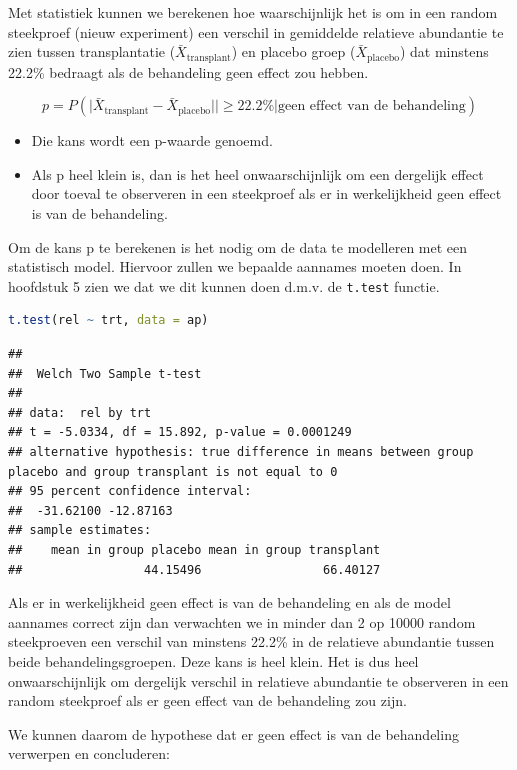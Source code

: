 \documentclass[
  12pt,dutch,coursenotes]{book}
\newcommand{\passthrough}[1]{#1}
\begin{document}
Met statistiek kunnen we berekenen hoe waarschijnlijk het is om in een random steekproef (nieuw experiment) een verschil in gemiddelde relatieve abundantie te zien tussen transplantatie (\(\bar X_\text{transplant}\)) en placebo groep (\(\bar X_\text{placebo}\)) dat minstens 22.2\% bedraagt als de behandeling geen effect zou hebben.

\[p=P( \vert \bar X_\text{transplant}-\bar X_\text{placebo}\vert \vert \geq 22.2\% \vert \text{geen effect van de behandeling})\]

\begin{itemize}
\item
  Die kans wordt een p-waarde genoemd.
\item
  Als p heel klein is, dan is het heel onwaarschijnlijk om een dergelijk effect door toeval te observeren in een steekproef als er in werkelijkheid geen effect is van de behandeling.
\end{itemize}

Om de kans p te berekenen is het nodig om de data te modelleren met een statistisch model. Hiervoor zullen we bepaalde aannames moeten doen. In hoofdstuk 5 zien we dat we dit kunnen doen d.m.v. de \passthrough{\lstinline!t.test!} functie.

\begin{lstlisting}[language=R]
t.test(rel ~ trt, data = ap)
\end{lstlisting}

\begin{lstlisting}
## 
##  Welch Two Sample t-test
## 
## data:  rel by trt
## t = -5.0334, df = 15.892, p-value = 0.0001249
## alternative hypothesis: true difference in means between group placebo and group transplant is not equal to 0
## 95 percent confidence interval:
##  -31.62100 -12.87163
## sample estimates:
##    mean in group placebo mean in group transplant 
##                 44.15496                 66.40127
\end{lstlisting}

Als er in werkelijkheid geen effect is van de behandeling en als de model aannames correct zijn dan verwachten we in minder dan 2 op 10000 random steekproeven een verschil van minstens 22.2\% in de relatieve abundantie tussen beide behandelingsgroepen.
Deze kans is heel klein. Het is dus heel onwaarschijnlijk om dergelijk verschil in relatieve abundantie te observeren in een random steekproef als er geen effect van de behandeling zou zijn.

We kunnen daarom de hypothese dat er geen effect is van de behandeling verwerpen en concluderen:
\end{document}
